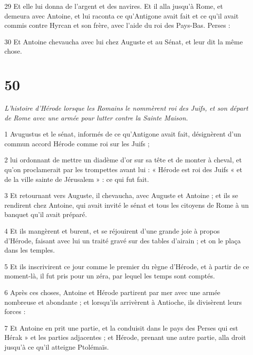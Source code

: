 \par 29 Et elle lui donna de l'argent et des navires. Et il alla jusqu'à Rome, et demeura avec Antoine, et lui raconta ce qu'Antigone avait fait et ce qu'il avait commis contre Hyrcan et son frère, avec l'aide du roi des Pays-Bas. Perses :

\par 30 Et Antoine chevaucha avec lui chez Auguste et au Sénat, et leur dit la même chose.

\chapter{50}

\par \textit{L'histoire d'Hérode lorsque les Romains le nommèrent roi des Juifs, et son départ de Rome avec une armée pour lutter contre la Sainte Maison.}

\par 1 Avugustus et le sénat, informés de ce qu'Antigone avait fait, désignèrent d'un commun accord Hérode comme roi sur les Juifs ;

\par 2 lui ordonnant de mettre un diadème d'or sur sa tête et de monter à cheval, et qu'on proclamerait par les trompettes avant lui : « Hérode est roi des Juifs « et de la ville sainte de Jérusalem » : ce qui fut fait.

\par 3 Et retournant vers Auguste, il chevaucha, avec Auguste et Antoine ; et ils se rendirent chez Antoine, qui avait invité le sénat et tous les citoyens de Rome à un banquet qu'il avait préparé.

\par 4 Et ils mangèrent et burent, et se réjouirent d'une grande joie à propos d'Hérode, faisant avec lui un traité gravé sur des tables d'airain ; et on le plaça dans les temples.

\par 5 Et ils inscrivirent ce jour comme le premier du règne d'Hérode, et à partir de ce moment-là, il fut pris pour un zéra, par lequel les temps sont comptés.

\par 6 Après ces choses, Antoine et Hérode partirent par mer avec une armée nombreuse et abondante ; et lorsqu'ils arrivèrent à Antioche, ils divisèrent leurs forces :

\par 7 Et Antoine en prit une partie, et la conduisit dans le pays des Perses qui est Hérak » et les parties adjacentes ; et Hérode, prenant une autre partie, alla droit jusqu'à ce qu'il atteigne Ptolémaïs.

